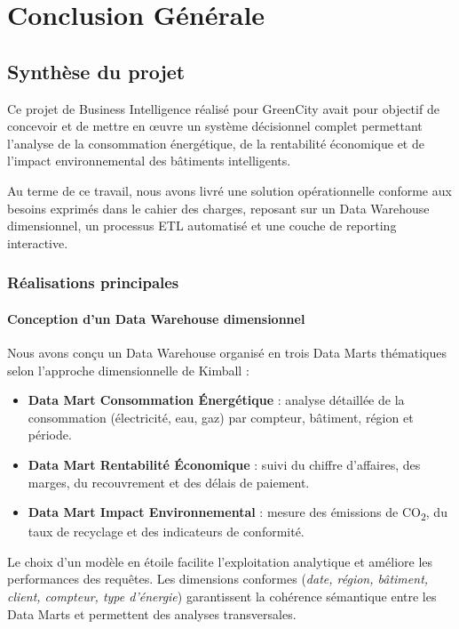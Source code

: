 \documentclass[12pt,a4paper]{report}
\begin{document}
\chapter{Conclusion Générale}

\section{Synthèse du projet}

Ce projet de Business Intelligence réalisé pour GreenCity avait pour objectif de concevoir et de mettre en œuvre un système décisionnel complet permettant l’analyse de la consommation énergétique, de la rentabilité économique et de l’impact environnemental des bâtiments intelligents.

Au terme de ce travail, nous avons livré une solution opérationnelle conforme aux besoins exprimés dans le cahier des charges, reposant sur un Data Warehouse dimensionnel, un processus ETL automatisé et une couche de reporting interactive.

\subsection{Réalisations principales}

\subsubsection{Conception d’un Data Warehouse dimensionnel}

Nous avons conçu un Data Warehouse organisé en trois Data Marts thématiques selon l’approche dimensionnelle de Kimball :

\begin{itemize}
    \item \textbf{Data Mart Consommation Énergétique} : analyse détaillée de la consommation (électricité, eau, gaz) par compteur, bâtiment, région et période.
    \item \textbf{Data Mart Rentabilité Économique} : suivi du chiffre d’affaires, des marges, du recouvrement et des délais de paiement.
    \item \textbf{Data Mart Impact Environnemental} : mesure des émissions de CO\textsubscript{2}, du taux de recyclage et des indicateurs de conformité.
\end{itemize}

Le choix d’un modèle en étoile facilite l’exploitation analytique et améliore les performances des requêtes. Les dimensions conformes (\textit{date, région, bâtiment, client, compteur, type d’énergie}) garantissent la cohérence sémantique entre les Data Marts et permettent des analyses transversales.
\end{document}
